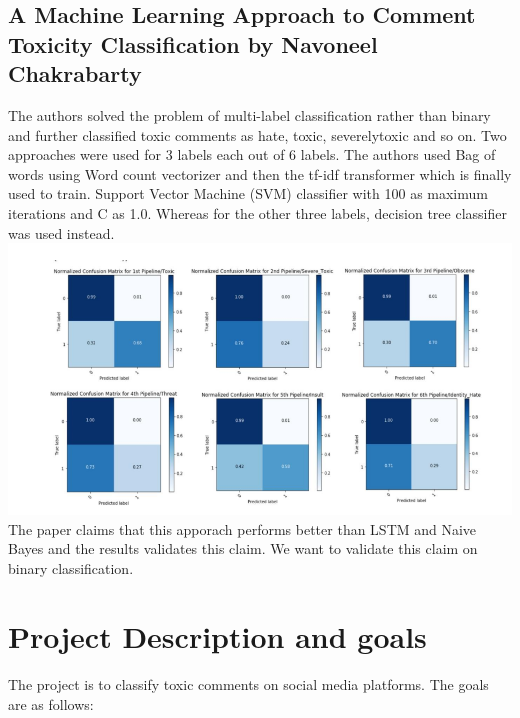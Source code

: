 \documentclass[11pt]{article}
\begin{document}
\subsection{A Machine Learning Approach to Comment Toxicity Classification by Navoneel Chakrabarty}
The authors solved the problem of multi-label classification rather than binary and further classified toxic comments as hate, toxic, severelytoxic and so on. Two approaches were used for 3 labels each out of 6 labels. The authors used Bag of words using Word count vectorizer and then the tf-idf transformer which is finally used to train. Support Vector Machine (SVM) classifier with 100 as maximum iterations and C as 1.0. Whereas for the other three labels, decision tree classifier was used instead.
\includegraphics[scale=0.9]{figs/chakra_all.png}
The paper claims that this apporach performs better than LSTM and Naive Bayes and the results validates this claim. We want to validate this claim on binary classification.
\section{Project Description and goals}
The project is to classify toxic comments on social media platforms. The goals are as follows:
\end{document}
